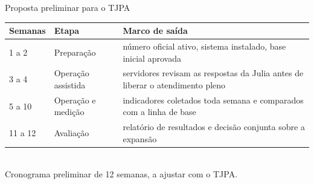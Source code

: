 \documentclass[aspectratio=169,10pt]{beamer}
\begin{document}
\begin{frame}{Proposta preliminar para o TJPA}
  \scriptsize
  \begin{tabularx}{\linewidth}{@{}l l X@{}}
    \toprule
    \textbf{Semanas} & \textbf{Etapa} & \textbf{Marco de saída} \\
    \midrule
    1 a 2   & Preparação          & número oficial ativo, sistema instalado, base inicial aprovada \\
    3 a 4   & Operação assistida  & servidores revisam as respostas da Julia antes de liberar o atendimento pleno \\
    5 a 10  & Operação e medição  & indicadores coletados toda semana e comparados com a linha de base \\
    11 a 12 & Avaliação           & relatório de resultados e decisão conjunta sobre a expansão \\
    \bottomrule
  \end{tabularx}\\[2pt]
  {\tiny\textcolor{cinza}{Cronograma preliminar de 12 semanas, a ajustar com o TJPA.}}
\end{frame}
\end{document}
